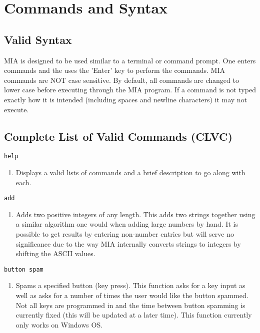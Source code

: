 \chapter{Commands and Syntax}
\pagestyle{fancy}

\section{Valid Syntax}
MIA is designed to be used similar to a terminal or command prompt. One enters commands and the uses the 'Enter' key to perform the commands. MIA commands are NOT case sensitive. By default, all commands are changed to lower case before executing through the MIA program. If a command is not typed exactly how it is intended (including spaces and newline characters) it may not execute.


\section{Complete List of Valid Commands (CLVC)} \label{CLVC}

\begin{lstlisting}
help
\end{lstlisting}
\begin{enumerate}
	\item[] Displays a valid lists of commands and a brief description to go along with each.
\end{enumerate}

\begin{lstlisting} 
add   
\end{lstlisting}
\begin{enumerate}
	\item[] Adds two positive integers of any length. This adds two strings together using a similar algorithm one would when adding large numbers by hand. It is possible to get results by entering non-number entries but will serve no significance due to the way MIA internally converts strings to integers by shifting the ASCII values.
\end{enumerate}

\begin{lstlisting} 
button spam
\end{lstlisting}
\begin{enumerate}
	\item[] Spams a specified button (key press). This function asks for a key input as well as asks for a number of times the user would like the button spammed. Not all keys are programmed in and the time between button spamming is currently fixed (this will be updated at a later time). This function currently only works on Windows OS.
\end{enumerate}

